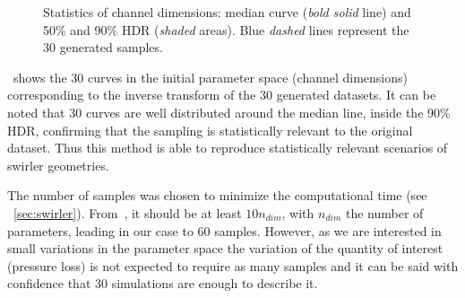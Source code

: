 \begin{figure}[!ht]
\centering
{}
\caption{Statistics of channel dimensions: median curve (\emph{bold solid} line) and 50\% and 90\% HDR (\emph{shaded} areas). Blue \emph{dashed} lines represent the 30 generated samples.}
\label{fig:samples}
\end{figure}

~shows the 30 curves in the initial parameter space (channel dimensions) corresponding to the inverse transform of the 30 generated datasets. It can be noted that 30 curves are well distributed around the median line, inside the 90\% HDR, confirming that the sampling is statistically relevant to the original dataset. Thus this method is able to reproduce statistically relevant scenarios of swirler geometries.

The number of samples was chosen to minimize the computational time (see ~\cref{sec:swirler}). From~\cite{Forrester2007}, it should be at least $10 n_{dim}$, with $n_{dim}$ the number of parameters, leading in our case to 60 samples. However, as we are interested in small variations in the parameter space the variation of the quantity of interest (pressure loss) is not expected to require as many samples and it can be said with confidence that 30 simulations are enough to describe it.

